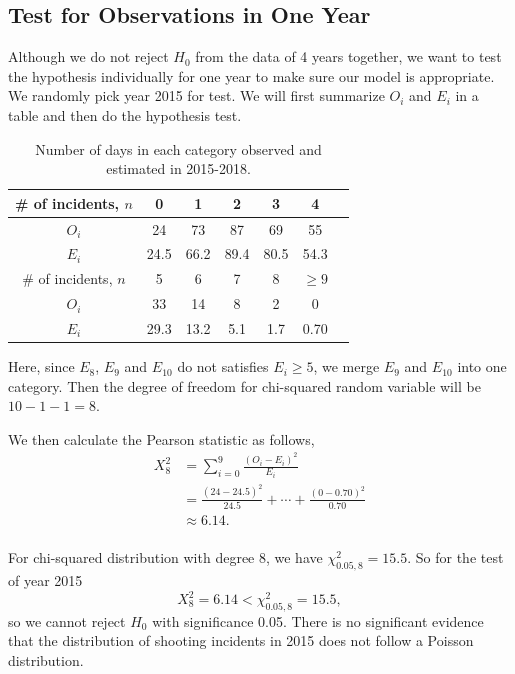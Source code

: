 \documentclass[11pt,a4paper,english]{article}
\begin{document}
\subsection{Test for Observations in One Year}
Although we do not reject $H_{0}$ from the data of 4 years together, we want to test the hypothesis individually for one year to make sure our model is appropriate. We randomly pick year 2015 for test. We will first summarize $O_{i}$ and $E_{i}$ in a table and then do the hypothesis test.

\begin{table}[htbp]
    \centering
	\begin{tabular}{c|cccccc}
		\hline
        \# of incidents, $n$ & 0 & 1 & 2 & 3 & 4  \\
		\hline
		$O_{i}$ & 24 & 73 & 87 & 69 & 55 \\
		\hline
		$E_{i}$ & 24.5 & 66.2 & 89.4 & 80.5 & 54.3 \\ 
		\hline
		\hline
		\# of incidents, $n$ & 5 & 6 & 7 & 8 & $\geq 9$  \\
		\hline
		$O_{i}$ & 33 & 14 & 8 & 2 & 0\\
		\hline
		$E_{i}$ & 29.3 & 13.2 & 5.1 & 1.7 & 0.70\\ 
		\hline 
    \end{tabular}
	\caption{Number of days in each category observed and estimated in 2015-2018.}
\end{table}

Here, since $E_{8}$, $E_{9}$ and $E_{10}$ do not satisfies $E_{i} \geq 5$, we merge $E_{9}$ and $E_{10}$ into one category. Then the degree of freedom for chi-squared random variable will be $10-1-1 = 8$.

We then calculate the Pearson statistic as follows,
\begin{align*}
	X_{8}^{2} &= \sum_{i = 0}^{9}\frac{(O_{i}-E_{i})^{2}}{E_{i}}\\
	&= \frac{(24-24.5)^{2}}{24.5}+\cdots+\frac{(0-0.70)^{2}}{0.70}\\
	&\approx 6.14.\\
\end{align*}

For chi-squared distribution with degree 8, we have $\chi_{0.05,8}^{2} = 15.5$. So for the test of year 2015
\begin{equation*}
	X_{8}^{2} = 6.14 < \chi_{0.05,8}^{2} = 15.5,
\end{equation*}
so we cannot reject $H_{0}$ with significance 0.05.
There is no significant evidence that the distribution of shooting incidents in 2015 does not follow a Poisson distribution.
\end{document}
